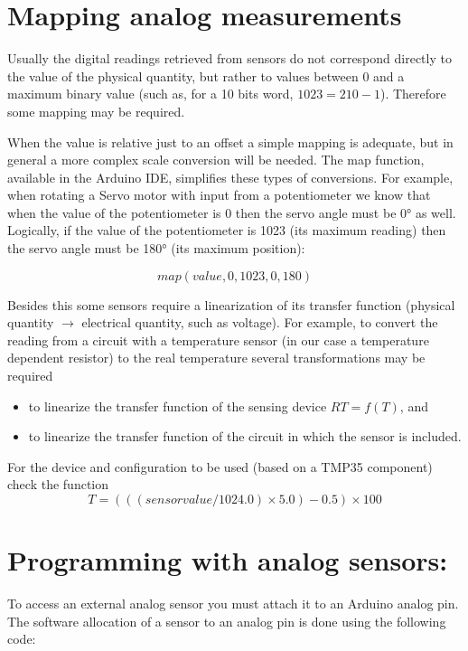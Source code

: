 \documentclass[10pt]{article}
\begin{document}
\section{Mapping analog measurements}\label{s:mapping}

Usually the digital readings retrieved from sensors do not correspond directly
to the value of the physical quantity, but rather to values between 0 and a
maximum binary value (such as, for a 10 bits word, $1023 = 210 - 1$). Therefore
some mapping may be required.

When the value is relative just to an offset a simple mapping is adequate, but
in general a more complex scale conversion will be needed. The map function,
available in the Arduino IDE, simplifies these types of conversions. For
example, when rotating a Servo motor with input from a potentiometer we know
that when the value of the potentiometer is 0 then the servo angle must be 0° as
well. Logically, if the value of the potentiometer is 1023 (its maximum reading)
then the servo angle must be 180° (its maximum position):

\[map(value, 0, 1023, 0, 180)\]

Besides this some sensors require a linearization of its transfer function
(physical quantity $\rightarrow$ electrical quantity, such as voltage). For
example, to convert the reading from a circuit with a temperature sensor (in our
case a temperature dependent resistor) to the real temperature several
transformations may be required

\begin{itemize}
    \item to linearize the transfer function of the sensing device $RT = f(T)$, and
    \item to linearize the transfer function of the circuit in which the sensor
        is included.
\end{itemize}

For the device and configuration to be used (based on a TMP35 component) check the function
\[T = (((sensor value / 1024.0) \times 5.0) - 0.5) \times  100\]

\section{Programming with analog sensors:}
To access an external analog sensor you must attach it to an Arduino analog pin.
The software allocation of a sensor to an analog pin is done using the following
code:
\end{document}
